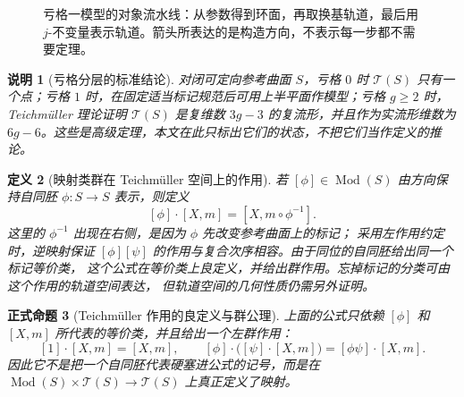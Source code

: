 \documentclass[UTF8,fontset=none,a4paper,11pt]{ctexart}
\theoremstyle{foundation-definition}
\newtheorem{definition}{定义}[section]
\theoremstyle{foundation-theorem}
\theoremstyle{foundation-proposition}
\newtheorem{proposition}[definition]{正式命题}
\theoremstyle{foundation-example}
\theoremstyle{foundation-remark}
\newtheorem{remark}[definition]{说明}
\theoremstyle{foundation-theorem}
\newcommand{\T}{\mathcal T}
\newcommand{\Mod}{\operatorname{Mod}}
\begin{document}
\begin{figure}[htbp]
\centering
{}
\caption{亏格一模型的对象流水线：从参数得到环面，再取换基轨道，最后用 \(j\)-不变量表示轨道。箭头所表达的是构造方向，不表示每一步都不需要定理。}
\label{fig:modular-object-pipeline}
\end{figure}

\begin{remark}[亏格分层的标准结论]
对闭可定向参考曲面 \(S\)，亏格 \(0\) 时 \(\T(S)\) 只有一个点；亏格 \(1\) 时，在固定适当标记规范后可用上半平面作模型；亏格 \(g\geq2\) 时，Teichmüller 理论证明 \(\T(S)\) 是复维数 \(3g-3\) 的复流形，并且作为实流形维数为 \(6g-6\)。这些是高级定理，本文在此只标出它们的状态，不把它们当作定义的推论。
\end{remark}

\begin{definition}[映射类群在 Teichmüller 空间上的作用]\label{def:teich-action}
若 \([\phi]\in\Mod(S)\) 由方向保持自同胚 \(\phi:S\to S\) 表示，则定义
\[
[\phi]\cdot[X,m]=[X,m\circ\phi^{-1}].
\]
这里的 \(\phi^{-1}\) 出现在右侧，是因为 \(\phi\) 先改变参考曲面上的标记；
采用左作用约定时，逆映射保证
\([ \phi ][ \psi ]\) 的作用与复合次序相容。由于同位的自同胚给出同一个标记等价类，
这个公式在等价类上良定义，并给出群作用。忘掉标记的分类可由这个作用的轨道空间表达，
但轨道空间的几何性质仍需另外证明。
\end{definition}

\begin{proposition}[Teichmüller 作用的良定义与群公理]\label{prop:teich-action-well-defined}
上面的公式只依赖 \([\phi]\) 和 \([X,m]\) 所代表的等价类，并且给出一个左群作用：
\[
[1]\cdot[X,m]=[X,m],\qquad
[\phi]\cdot\bigl([\psi]\cdot[X,m]\bigr)
=[\phi\psi]\cdot[X,m].
\]
因此它不是把一个自同胚代表硬塞进公式的记号，而是在
\(\Mod(S)\times\T(S)\to\T(S)\) 上真正定义了映射。
\end{proposition}
\end{document}
